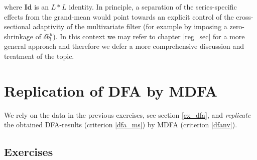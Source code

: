 \documentclass[a4paper]{book}
\begin{document}
where $\mathbf{Id}$ is an $L*L$ identity. In principle, a separation of the series-specific effects from the grand-mean would point towards an explicit control of the cross-sectional adaptivity of the multivariate filter (for example by imposing a zero-shrinkage of $\delta b_l^u$). In this context we may refer to chapter \ref{reg_sec} for a more general approach and therefore we defer a more comprehensive discussion and treatment of the topic.



\section{Replication of DFA by MDFA}\label{ex_rep_dfa}


We rely on the data in the previous exercises, see section \ref{ex_dfa}, and \emph{replicate} the obtained DFA-results (criterion \ref{dfa_ms}) by MDFA (criterion \ref{dfanv}). 

\subsection{Exercises}\label{ex_rep_dfa_11}
\end{document}

